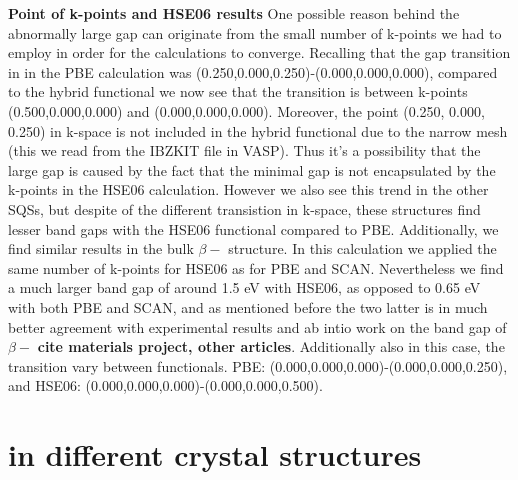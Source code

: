 \textbf{Point of k-points and HSE06 results}
One possible reason behind the abnormally large gap can originate from the small number of k-points we had to employ in order for the calculations to converge. Recalling that the gap transition in in the PBE calculation was (0.250,0.000,0.250)-(0.000,0.000,0.000), compared to the hybrid functional we now see that the transition is between k-points (0.500,0.000,0.000) and (0.000,0.000,0.000). Moreover, the point (0.250, 0.000, 0.250) in k-space is not included in the hybrid functional due to the narrow mesh (this we read from the IBZKIT file in VASP). Thus it's a possibility that the large gap is caused by the fact that the minimal gap is not encapsulated by the k-points in the HSE06 calculation. However we also see this trend in the other SQSs, but despite of the different transistion in k-space, these structures find lesser band gaps with the HSE06 functional compared to PBE. Additionally, we find similar results in the bulk $\beta-$ structure. In this calculation we applied the same number of k-points for HSE06 as for PBE and SCAN. Nevertheless we find a much larger band gap of around 1.5 eV with HSE06, as opposed to 0.65 eV with both PBE and SCAN, and as mentioned before the two latter is in much better agreement with experimental results and ab intio work on the band gap of $\beta-$ \textbf{cite materials project, other articles}. Additionally also in this case, the transition vary between functionals. PBE: (0.000,0.000,0.000)-(0.000,0.000,0.250), and HSE06: (0.000,0.000,0.000)-(0.000,0.000,0.500).



\section{ in different crystal structures}

